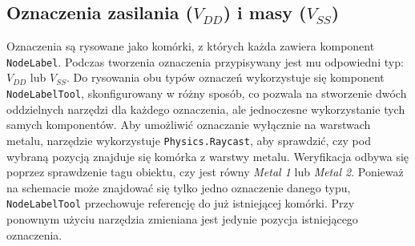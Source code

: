 \subsection{Oznaczenia zasilania ($V_{DD}$) i masy ($V_{SS}$)}
\label{subsec:oznaczenia_zasilania}

Oznaczenia są rysowane jako komórki,
z których każda zawiera komponent \texttt{NodeLabel}.
Podczas tworzenia oznaczenia przypisywany jest mu odpowiedni typ: $V_{DD}$ lub $V_{SS}$.
Do rysowania obu typów oznaczeń wykorzystuje się komponent \texttt{NodeLabelTool},
skonfigurowany w różny sposób, co pozwala na stworzenie dwóch oddzielnych narzędzi dla każdego oznaczenia,
ale jednoczesne wykorzystanie tych samych komponentów.
Aby umożliwić oznaczanie wyłącznie na warstwach metalu, narzędzie wykorzystuje \texttt{Physics.Raycast},
aby sprawdzić, czy pod wybraną pozycją znajduje się komórka z warstwy metalu.
Weryfikacja odbywa się poprzez sprawdzenie tagu obiektu, czy jest równy \textit{Metal 1} lub \textit{Metal 2}.
Ponieważ na schemacie może znajdować się tylko jedno oznaczenie danego typu,
\texttt{NodeLabelTool} przechowuje referencję do już istniejącej komórki.
Przy ponownym użyciu narzędzia zmieniana jest jedynie pozycja istniejącego oznaczenia.


